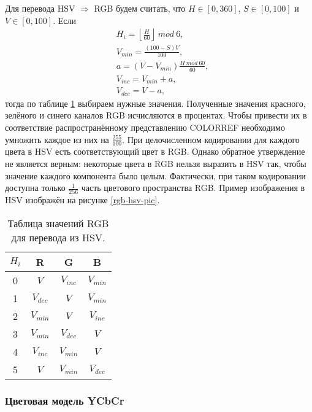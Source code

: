 Для перевода HSV $\Rightarrow$ RGB будем считать, что $H \in [0,360]$, $S \in [0, 100]$ и
$V \in [0, 100]$. Если
\begin{equation}
	\begin{aligned}
	&H_i = \left\lfloor \frac{H}{60} \right\rfloor~mod~6, \\
	&V_{min} = \frac{(100-S)V}{100}, \\
	&a = (V-V_{min})\frac{H~mod~60}{60}, \\
	&V_{inc} = V_{min} + a, \\
	&V_{dec} = V-a,
\end{aligned}
\label{hsv-to-rgb}
\end{equation}
тогда по таблице \ref{rgb-hsv-table} выбираем нужные значения. Полученные значения красного, зелёного
и синего каналов RGB исчисляются в процентах. Чтобы привести их в соответствие распространённому
представлению COLORREF необходимо умножить каждое из них на $\displaystyle\frac{255}{100}$.
При целочисленном кодировании для каждого цвета в HSV есть соответствующий цвет в RGB. Однако
обратное утверждение не является верным: некоторые цвета в RGB нельзя выразить в HSV так, чтобы
значение каждого компонента было целым. Фактически, при таком кодировании доступна только
$\displaystyle\frac{1}{256}$ часть цветового пространства RGB. Пример изображения в HSV
изображён на рисунке \ref{rgb-hsv-pic}.
\newpage
\begin{table}[ht]
	\centering
	\begin{tabular}
		{|c|c|c|c|}
		\hline $H_i$ & R & G & B \\ \hline 
		0 & $V$ & $V_{inc}$ & $V_{min}$ \\ \hline 
		1 & $V_{dec}$ & $V$ & $V_{min}$ \\ \hline 
		2 & $V_{min}$ & $V$ & $V_{inc}$ \\ \hline 
		3 & $V_{min}$ & $V_{dec}$ & $V$ \\ \hline 
		4 & $V_{inc}$ & $V_{min}$ & $V$ \\ \hline 
		5 & $V$ & $V_{min}$ & $V_{dec}$ \\ \hline 
	\end{tabular}
	\caption{Таблица значений RGB для перевода из HSV.}
	\label{rgb-hsv-table}
\end{table}


\subsubsection{Цветовая модель YCbCr}

